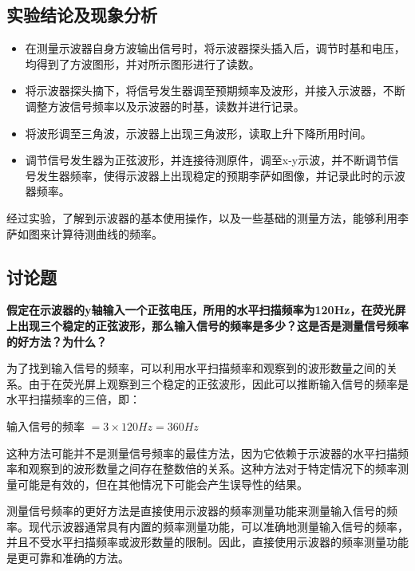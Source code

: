 \documentclass{ctexart}
\begin{document}
\newpage
\subsection{实验结论及现象分析}

\begin{itemize}
    \item 在测量示波器自身方波输出信号时，将示波器探头插入后，调节时基和电压，均得到了方波图形，并对所示图形进行了读数。
    \item 将示波器探头摘下，将信号发生器调至预期频率及波形，并接入示波器，不断调整方波信号频率以及示波器的时基，读数并进行记录。
    \item 将波形调至三角波，示波器上出现三角波形，读取上升下降所用时间。
    \item 调节信号发生器为正弦波形，并连接待测原件，调至x-y示波，并不断调节信号发生器频率，使得示波器上出现稳定的预期李萨如图像，并记录此时的示波器频率。
\end{itemize}

经过实验，了解到示波器的基本使用操作，以及一些基础的测量方法，能够利用李萨如图来计算待测曲线的频率。

\subsection{讨论题}

\textbf{假定在示波器的y轴输入一个正弦电压，所用的水平扫描频率为120Hz，在荧光屏上出现三个稳定的正弦波形，那么输入信号的频率是多少？这是否是测量信号频率的好方法？为什么？}

为了找到输入信号的频率，可以利用水平扫描频率和观察到的波形数量之间的关系。由于在荧光屏上观察到三个稳定的正弦波形，因此可以推断输入信号的频率是水平扫描频率的三倍，即：

输入信号的频率 $=3×120Hz=360Hz$

这种方法可能并不是测量信号频率的最佳方法，因为它依赖于示波器的水平扫描频率和观察到的波形数量之间存在整数倍的关系。这种方法对于特定情况下的频率测量可能是有效的，但在其他情况下可能会产生误导性的结果。

测量信号频率的更好方法是直接使用示波器的频率测量功能来测量输入信号的频率。现代示波器通常具有内置的频率测量功能，可以准确地测量输入信号的频率，并且不受水平扫描频率或波形数量的限制。因此，直接使用示波器的频率测量功能是更可靠和准确的方法。
\end{document}
